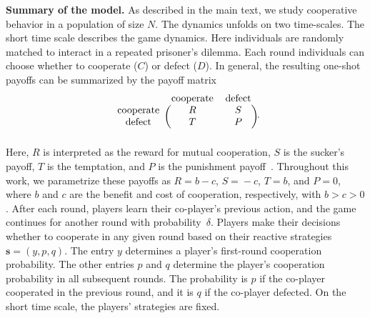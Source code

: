 \documentclass[11pt]{article}
\theoremstyle{plainCl1}
\theoremstyle{plainCl2}
\begin{document}
\noindent
{\bf Summary of the model.} As described in the main text, we study cooperative behavior in a population of size $N$.
The dynamics unfolds on two time-scales. 
The short time scale describes the game dynamics. 
Here individuals are randomly matched to interact in a repeated prisoner's dilemma.  
Each round individuals can choose whether to cooperate ($C$) or defect ($D$). 
In general, the resulting one-shot payoffs can be summarized by the payoff matrix 
\begin{equation}\label{eq:donation}
    \begin{blockarray}{ccc}
        & \text{cooperate} & \text{defect} \\
        \begin{block}{c(cc)}
            \text{cooperate} & R & S \\
            \text{defect} & T & P \\
        \end{block}
    \end{blockarray}.
\end{equation}
Here, $R$ is interpreted as the reward for mutual cooperation, $S$ is the sucker's payoff, $T$ is the temptation, and $P$ is the punishment payoff~\citep{axelrod1981evolution}. 
Throughout this work, we parametrize these payoffs as $R\!=\!b\!-\!c$, $S\!=\!-c$, $T\!=\!b$, and $P\!=\!0$, where $b$ and $c$ are the benefit and cost of cooperation, respectively, with $b\!>\!c\!>0$. 
After each round, players learn their co-player's previous action, and the game continues for another round with probability~$\delta$.
Players make their decisions whether to cooperate in any given round based on their reactive strategies $\mathbf{s}\!=\!(y,p,q)$. 
The entry $y$ determines a player's first-round cooperation probability. 
The other entries $p$ and $q$ determine the player's cooperation probability in all subsequent rounds. 
The probability is $p$ if the co-player cooperated in the previous round, and it is $q$ if the co-player defected. 
On the short time scale, the players' strategies are fixed. 

\end{document}
